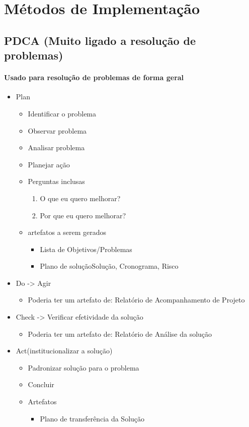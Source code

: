 \documentclass{article}
\begin{document}
\section{Métodos de Implementação} \date{19/05/2014}
\subsection{PDCA (Muito ligado a resolução de problemas)}
\paragraph{Usado para resolução de problemas de forma geral}
	\begin{itemize}
	\item Plan
		\begin{itemize}
		\item Identificar o problema
		\item Observar problema
		\item Analisar problema
		\item Planejar ação	
		
		\item Perguntas inclusas
			\begin{enumerate}
			\item O que eu quero melhorar?
			\item Por que eu quero melhorar?
			
			\end{enumerate}
		\item artefatos a serem gerados
			\begin{itemize}
			\item Lista de Objetivos/Problemas
			\item Plano de solução{Solução, Cronograma, Risco}
			\end{itemize}									
		\end{itemize}				

	\item Do -> Agir
		\begin{itemize}
		\item Poderia ter um artefato de: Relatório de Acompanhamento de Projeto
		\end{itemize}
	\item Check -> Verificar efetividade da solução
		\begin{itemize}
		\item Poderia ter um artefato de: Relatório de Análise da solução
		\end{itemize}
	\item Act(institucionalizar a solução)
		\begin{itemize}
		\item Padronizar solução para o problema
		\item Concluir
		\item Artefatos
			\begin{itemize}
			\item Plano de transferência da Solução
			\end{itemize}
		\end{itemize}			
		
	\end{itemize}
	
\end{document}
